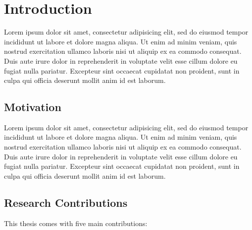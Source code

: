 \chapter{Introduction}\label{ch:introduction}

Lorem ipsum dolor sit amet, consectetur adipisicing elit, sed do eiusmod tempor incididunt ut labore et dolore magna aliqua. Ut enim ad minim veniam, quis nostrud exercitation ullamco laboris nisi ut aliquip ex ea commodo consequat. Duis aute irure dolor in reprehenderit in voluptate velit esse cillum dolore eu fugiat nulla pariatur. Excepteur sint occaecat cupidatat non proident, sunt in culpa qui officia deserunt mollit anim id est laborum.


\section{Motivation}
Lorem ipsum dolor sit amet, consectetur adipisicing elit, sed do eiusmod tempor incididunt ut labore et dolore magna aliqua. Ut enim ad minim veniam, quis nostrud exercitation ullamco laboris nisi ut aliquip ex ea commodo consequat. Duis aute irure dolor in reprehenderit in voluptate velit esse cillum dolore eu fugiat nulla pariatur. Excepteur sint occaecat cupidatat non proident, sunt in culpa qui officia deserunt mollit anim id est laborum.


\clearpage
\section{Research Contributions}

This thesis comes with five main contributions:

